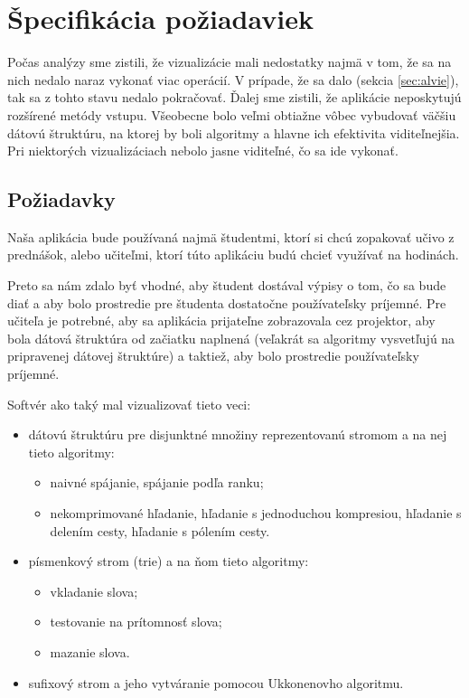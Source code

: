 \clearpage
\section{Špecifikácia požiadaviek}

Počas analýzy sme zistili, že vizualizácie mali nedostatky najmä v tom, že sa 
na nich nedalo naraz vykonať viac operácií. V prípade, že sa dalo (sekcia 
\ref{sec:alvie}), tak sa z tohto stavu nedalo pokračovať. Ďalej sme zistili, 
že aplikácie neposkytujú rozšírené metódy vstupu. Všeobecne bolo veľmi 
obtiažne vôbec vybudovať väčšiu dátovú štruktúru, na ktorej by boli algoritmy 
a hlavne ich efektivita viditeľnejšia. Pri niektorých vizualizáciach nebolo 
jasne viditeľné, čo sa ide vykonať.

\subsection{Požiadavky}

Naša aplikácia bude používaná najmä študentmi, ktorí si chcú zopakovať učivo 
z prednášok, alebo učiteľmi, ktorí túto aplikáciu budú chcieť využívať na 
hodinách.

Preto sa nám zdalo byť vhodné, aby študent dostával výpisy o tom, čo sa bude 
diať a aby bolo prostredie pre študenta dostatočne používateľsky príjemné. Pre 
učiteľa je potrebné, aby sa aplikácia prijateľne zobrazovala cez projektor, 
aby bola dátová štruktúra od začiatku naplnená (veľakrát sa algoritmy 
vysvetľujú na pripravenej dátovej štruktúre) a taktiež, aby bolo prostredie 
používateľsky príjemné.

Softvér ako taký mal vizualizovať tieto veci:
\begin{itemize}
\item dátovú štruktúru pre disjunktné množiny reprezentovanú stromom a na nej 
tieto algoritmy:
	\begin{itemize}
	\item naivné spájanie, spájanie podľa ranku;
	\item nekomprimované hľadanie, hľadanie s jednoduchou kompresiou, hľadanie s 
	delením cesty, hľadanie s pólením cesty.
	\end{itemize}
\item písmenkový strom (trie) a na ňom tieto algoritmy:
	\begin{itemize}
	\item vkladanie slova;
	\item testovanie na prítomnosť slova;
	\item mazanie slova.
	\end{itemize}
\item sufixový strom a jeho vytváranie pomocou Ukkonenovho algoritmu.
\end{itemize}

